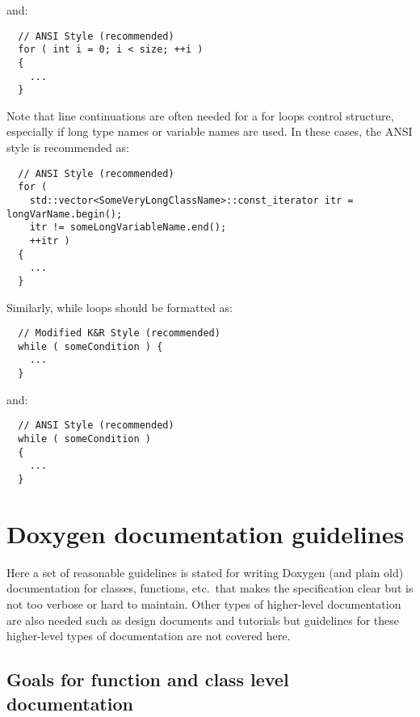 \begin{enumerate}
\begin{enumerate}
  {}\noindent{}and:

  {\small\begin{verbatim}
  // ANSI Style (recommended)
  for ( int i = 0; i < size; ++i )
  {
    ...
  }
  \end{verbatim}}

  Note that line continuations are often needed for a for loops control
  structure, especially if long type names or variable names are used.  In
  these cases, the ANSI style is recommended as:

  {\small\begin{verbatim}
  // ANSI Style (recommended)
  for (
    std::vector<SomeVeryLongClassName>::const_iterator itr = longVarName.begin();
    itr != someLongVariableName.end();
    ++itr )
  {
    ...
  }
  \end{verbatim}}

  Similarly, while loops should be formatted as:

  {\small\begin{verbatim}
  // Modified K&R Style (recommended)
  while ( someCondition ) {
    ...
  }
  \end{verbatim}}

  {}\noindent{}and:

  {\small\begin{verbatim}
  // ANSI Style (recommended)
  while ( someCondition )
  {
    ...
  }
  \end{verbatim}}

  \end{enumerate}

\end{enumerate}

%
\section{Doxygen documentation guidelines}
%

Here a set of reasonable guidelines is stated for writing Doxygen (and plain
old) documentation for classes, functions, etc.\ that makes the specification
clear but is not too verbose or hard to maintain.  Other types of higher-level
documentation are also needed such as design documents and tutorials but
guidelines for these higher-level types of documentation are not covered here.

%
\subsection{Goals for function and class level documentation}
%

